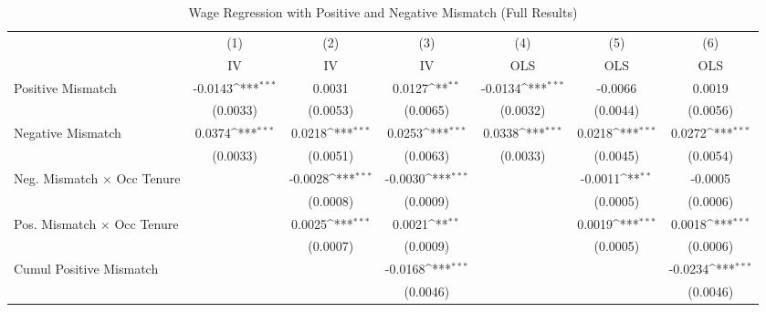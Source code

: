 {
\def\sym#1{\ifmmode^{#1}\else\(^{#1}\)\fi}
\begin{longtable}{l*{6}{c}}
\caption{Wage Regression with Positive and Negative Mismatch (Full Results)}\\
\hline  \endfirsthead\hline  \endhead\hline  \endfoot\endlastfoot
                    &\multicolumn{1}{c}{(1)}&\multicolumn{1}{c}{(2)}&\multicolumn{1}{c}{(3)}&\multicolumn{1}{c}{(4)}&\multicolumn{1}{c}{(5)}&\multicolumn{1}{c}{(6)}\\
                    &\multicolumn{1}{c}{IV}&\multicolumn{1}{c}{IV}&\multicolumn{1}{c}{IV}&\multicolumn{1}{c}{OLS}&\multicolumn{1}{c}{OLS}&\multicolumn{1}{c}{OLS}\\
\hline  
Positive Mismatch   &     -0.0143\sym{***}&      0.0031         &      0.0127\sym{**} &     -0.0134\sym{***}&     -0.0066         &      0.0019         \\
                    &    (0.0033)         &    (0.0053)         &    (0.0065)         &    (0.0032)         &    (0.0044)         &    (0.0056)         \\
Negative Mismatch   &      0.0374\sym{***}&      0.0218\sym{***}&      0.0253\sym{***}&      0.0338\sym{***}&      0.0218\sym{***}&      0.0272\sym{***}\\
                    &    (0.0033)         &    (0.0051)         &    (0.0063)         &    (0.0033)         &    (0.0045)         &    (0.0054)         \\
Neg. Mismatch $\times$ Occ Tenure&                     &     -0.0028\sym{***}&     -0.0030\sym{***}&                     &     -0.0011\sym{**} &     -0.0005         \\
                    &                     &    (0.0008)         &    (0.0009)         &                     &    (0.0005)         &    (0.0006)         \\
Pos. Mismatch $\times$ Occ Tenure&                     &      0.0025\sym{***}&      0.0021\sym{**} &                     &      0.0019\sym{***}&      0.0018\sym{***}\\
                    &                     &    (0.0007)         &    (0.0009)         &                     &    (0.0005)         &    (0.0006)         \\
Cumul Positive Mismatch&                     &                     &     -0.0168\sym{***}&                     &                     &     -0.0234\sym{***}\\
                    &                     &                     &    (0.0046)         &                     &                     &    (0.0046)         \\

\end{longtable}}
